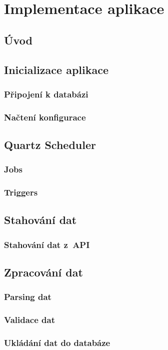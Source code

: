 \chapter{Implementace aplikace}
\section{Úvod}

\section{Inicializace aplikace}
\subsection{Připojení k databázi}
\subsection{Načtení konfigurace}

\section{Quartz Scheduler}
\subsection{Jobs}
\subsection{Triggers}

\section{Stahování dat}
\subsection{Stahování dat z~API}

\section{Zpracování dat}
\subsection{Parsing dat}
\subsection{Validace dat}
\subsection{Ukládání dat do databáze}
